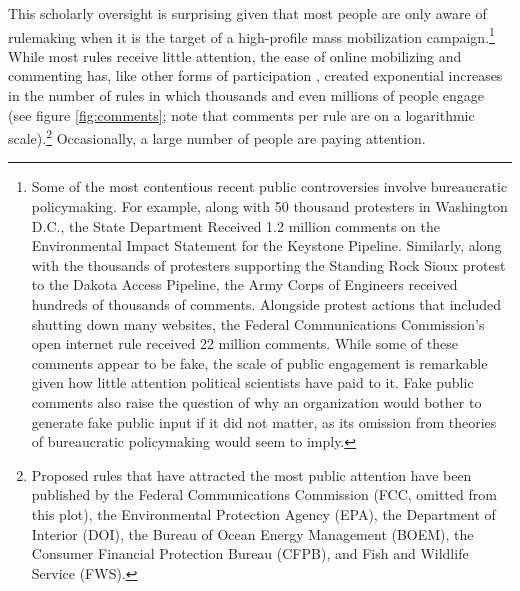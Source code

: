 This scholarly oversight is surprising given that most people are only aware of rulemaking when it is the target of a high-profile mass mobilization campaign.\footnote{Some of the most contentious recent public controversies involve bureaucratic policymaking. For example, along with 50 thousand protesters in Washington D.C., the State Department Received 1.2 million comments on the Environmental Impact Statement for the Keystone Pipeline. Similarly, along with the thousands of protesters supporting the Standing Rock Sioux protest to the Dakota Access Pipeline, the Army Corps of Engineers received hundreds of thousands of comments. Alongside protest actions that included shutting down many websites, the Federal Communications Commission's open internet rule received 22 million comments. While some of these comments appear to be fake, the scale of public engagement is remarkable given how little attention political scientists have paid to it. Fake public comments also raise the question of why an organization would bother to generate fake public input if it did not matter, as its omission from theories of bureaucratic policymaking would seem to imply. %
} 
While most rules receive little attention, the ease of online mobilizing and commenting has, like other forms of participation \citep{Boulianne2018}, created exponential increases in the number of rules in which thousands and even millions of people engage (see figure \ref{fig:comments}; note that comments per rule are on a logarithmic scale).\footnote{Proposed rules that have attracted the most public attention have been published by the Federal Communications Commission (FCC, omitted from this plot), the Environmental Protection Agency (EPA), the Department of Interior (DOI), the Bureau of Ocean Energy Management (BOEM), the Consumer Financial Protection Bureau (CFPB), and Fish and Wildlife Service (FWS).} Occasionally, a large number of people are paying attention.

